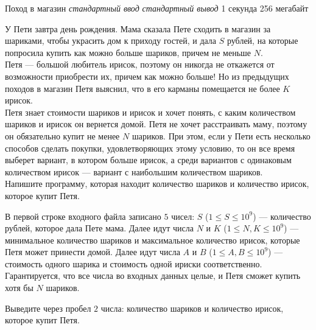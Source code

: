 \begin{problem}%
{Поход в магазин}%
{\textsl{стандартный ввод}}%
{\textsl{стандартный вывод}}%
{1 секунда}%
{256 мегабайт}{}

У Пети завтра день рождения. Мама сказала Пете сходить в магазин за шариками, чтобы украсить дом к приходу гостей, и дала $S$ рублей, на которые попросила купить как можно больше шариков, причем не меньше $N$.\\

Петя — большой любитель ирисок, поэтому он никогда не откажется от возможности приобрести их, причем как можно больше! Но из предыдущих походов в магазин Петя выяснил, что в его карманы помещается не более $K$ ирисок.\\

Петя знает стоимости шариков и ирисок и хочет понять, с каким количеством шариков и ирисок он вернется домой. Петя не хочет расстраивать маму, поэтому он обязательно купит не менее $N$ шариков. При этом, если у Пети есть несколько способов сделать покупки, удовлетворяющих этому условию, то он все время выберет вариант, в котором больше ирисок, а среди вариантов с одинаковым количеством ирисок — вариант с наибольшим количеством шариков.\\

Напишите программу, которая находит количество шариков и количество ирисок, которое купит Петя.

\InputFile

В первой строке входного файла записано $5$ чисел: $S$ ($1 \le S \le 10^9$) — количество рублей, которое дала Пете мама. Далее идут числа $N$ и $K$ ($1 \le N, K \le 10^9$) — минимальное
количество шариков и максимальное количество ирисок, которые Петя может принести домой. Далее идут числа $A$ и $B$ ($1 \le A, B \le 10^9$) — стоимость одного шарика и стоимость одной ириски соответственно.\\

Гарантируется, что все числа во входных данных целые, и Петя сможет купить хотя бы $N$ шариков.

\OutputFile

Выведите через пробел $2$ числа: количество шариков и количество ирисок, которое купит Петя.

\Examples

\begin{example}
%
%
%
\end{example}
\end{problem}
